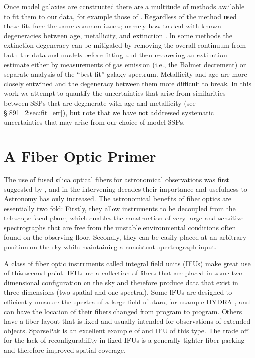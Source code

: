 Once model galaxies are constructed there are a multitude of methods
available to fit them to our data, for example those of
\citep{Cappellari04, Tojeiro07,Chen12, CidFernandes05, Ocvirk06,
  Wilkinson15, Sanchez16}. Regardless of the method used these fits
face the same common issues; namely how to deal with known
degeneracies between age, metallicity, and extinction
\citep{Oconnel76,Aaronson78,Worthey94,dePaz02}. In some methods the
extinction degeneracy can be mitigated by removing the overall
continuum from both the data and models before fitting
\citep[e.g.,][]{Ocvirk06,Wilkinson15} and then recovering an
extinction estimate either by measurements of gas emission (i.e., the
Balmer decrement) or separate analysis of the ``best fit'' galaxy
spectrum. Metallicity and age are more closely entwined and the
degeneracy between them more difficult to break. In this work we
attempt to quantify the uncertainties that arise from similarities
between SSPs that are degenerate with age and metallicity (see
\S\ref{891_2:sec:fit_err}), but note that we have not addressed systematic
uncertainties that may arise from our choice of model SSPs.

\section{A Fiber Optic Primer}
\label{intro:sec:fiber}
The use of fused silica optical fibers for astronomical observations
was first suggested by \citet{Angel77}, and in the intervening decades
their importance and usefulness to Astronomy has only increased. The
astronomical benefits of fiber optics are essentially two fold:
Firstly, they allow instruments to be decoupled from the telescope
focal plane, which enables the construction of very large and
sensitive spectrographs that are free from the unstable environmental
conditions often found on the observing floor. Secondly, they can be
easily placed at an arbitrary position on the sky while maintaining a
consistent spectrograph input.

A class of fiber optic instruments called integral field units (IFUs)
make great use of this second point. IFUs are a collection of fibers
that are placed in some two-dimensional configuration on the sky and
therefore produce data that exist in three dimensions (two spatial and
one spectral). Some IFUs are designed to efficiently measure the
spectra of a large field of stars, for example HYDRA \citep{Barden93},
and can have the location of their fibers changed from program to
program. Others have a fiber layout that is fixed and usually intended
for observations of extended objects. SparsePak
\citep{Bershady04,Bershady05} is an excellent example of and IFU of
this type. The trade off for the lack of reconfigurability in fixed
IFUs is a generally tighter fiber packing and therefore improved
spatial coverage.

